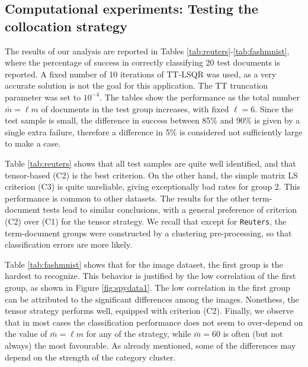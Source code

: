 \documentclass{siamart190516}
\begin{document}
\subsection{Computational experiments: Testing the collocation strategy}\label{sec:expes2}
The results of our analysis are reported in Tables \ref{tab:reuters}-\ref{tab:fashmnist},
where the percentage of success in correctly
classifying 20 test documents is reported.
A fixed number of 10 iterations of TT-LSQR was used, as a very accurate solution 
is not the goal for this application. The TT
truncation parameter was set to $10^{-4}$.
%
 The tables show the performance as the total
 number $\bar m=\ell m$ of 
 documents in the test group increases, with
 fixed $\ell=6$.
Since the test sample is small, the difference in success between 85\% and 90\% is given by a single extra failure, therefore a difference in 5\% is considered not sufficiently large to make a case.

Table \ref{tab:reuters} shows that all test samples
are quite well identified, and that tensor-based (C2) is the best criterion. On the other hand, the simple matrix LS criterion (C3) is quite unreliable, giving exceptionally bad rates for group 2. This
performance is common to other datasets.
The results for the other term-document tests lead to similar conclusions, with a general preference
of criterion (C2) over (C1) for the tensor strategy.
We recall that except for {\tt Reuters}, the term-document groups were constructed by a clustering pre-processing, so that classification errors are more likely.

Table \ref{tab:fashmnist} shows that for the  image dataset, the first group is the hardest to recognize. This behavior is justified by the low correlation of the first group, as shown in Figure \ref{fig:spydata1}. The low correlation in the first group can be attributed to the significant differences among the images. Nonethess, the tensor strategy performs well, equipped with criterion (C2).
%
Finally, we observe that in most cases
the classification performance does not seem to over-depend on the value of
$\bar m =\ell m$ for any of the strategy,
while $\bar m=60$ is often (but not always)
the most favourable. As already mentioned,
some of the differences may depend on the
strength of the category cluster.
\end{document}
